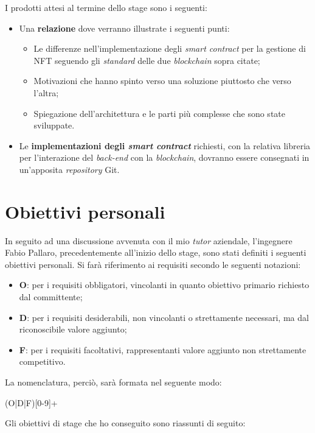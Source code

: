 \noindent I prodotti attesi al termine dello stage sono i seguenti:
\begin{itemize}
  \item Una \textbf{relazione} dove verranno illustrate i seguenti punti:
  \begin{itemize}
    \item Le differenze nell'implementazione degli \emph{smart contract} per la gestione di NFT seguendo gli \emph{standard} delle due \emph{blockchain} sopra citate;
    \item Motivazioni che hanno spinto verso una soluzione piuttosto che verso l'altra;
    \item Spiegazione dell'architettura e le parti più complesse che sono state sviluppate.
  \end{itemize}
  \item Le \textbf{implementazioni degli \emph{smart contract}} richiesti, con la relativa libreria per l'interazione del \emph{back-end} con la \emph{blockchain}, dovranno essere consegnati in un'apposita \emph{repository} Git.
\end{itemize}

\section{Obiettivi personali}
In seguito ad una discussione avvenuta con il mio \emph{tutor} aziendale, l'ingegnere Fabio Pallaro, precedentemente all'inizio dello stage, sono stati definiti i seguenti obiettivi personali. Si farà riferimento ai requisiti secondo le seguenti notazioni:
\begin{itemize}
  \item \textbf{O}: per i requisiti obbligatori, vincolanti in quanto obiettivo primario richiesto dal committente;
  \item \textbf{D}: per i requisiti desiderabili, non vincolanti o strettamente necessari, ma dal riconoscibile valore aggiunto;
  \item \textbf{F}: per i requisiti facoltativi, rappresentanti valore aggiunto non strettamente competitivo.
\end{itemize}

\noindent La nomenclatura, perciò, sarà formata nel seguente modo:
\begin{center}
  (O|D|F)[0-9]+
\end{center}

\noindent Gli obiettivi di stage che ho conseguito sono riassunti di seguito:

